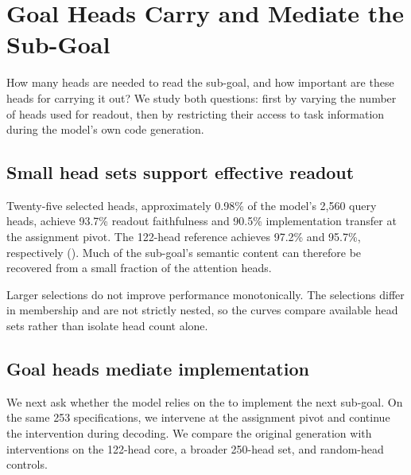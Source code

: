 \section{Goal Heads Carry and Mediate the Sub-Goal}
\label{sec:heads}
How many heads are needed to read the sub-goal, and how important are these heads for carrying it out? We study both questions: first by varying the number of heads used for readout, then by restricting their access to task information during the model's own code generation.


\subsection{Small head sets support effective readout}
\label{sec:heads:sparsity}

Twenty-five selected heads, approximately 0.98\% of the model's 2,560 query heads, achieve 93.7\% readout faithfulness and 90.5\% implementation transfer at the assignment pivot. The 122-head reference achieves 97.2\% and 95.7\%, respectively (). Much of the sub-goal's semantic content can therefore be recovered from a small fraction of the attention heads.

Larger selections do not improve performance monotonically. The selections differ in membership and are not strictly nested, so the curves compare available head sets rather than isolate head count alone. 

\subsection{Goal heads mediate implementation}
\label{sec:mechanism:ablation}
We next ask whether the model relies on the \goalheads to implement the next sub-goal. On the same 253 specifications, we intervene at the assignment pivot and continue the intervention during decoding. We compare the original generation with interventions on the 122-head core, a broader 250-head set, and random-head controls.

